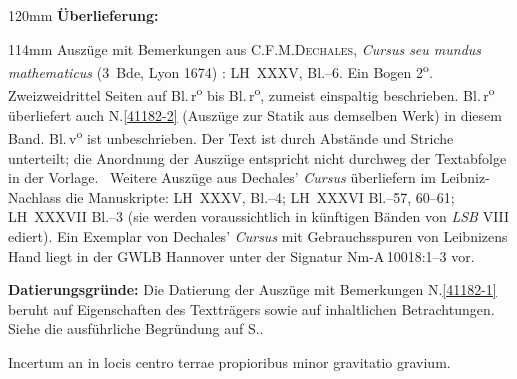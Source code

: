 %
\frenchspacing%
\begin{ledgroupsized}[r]{120mm}%
\footnotesize%
\pstart%
\noindent\textbf{Überlieferung:}%
\pend%
\end{ledgroupsized}%
\begin{ledgroupsized}[r]{114mm}%
\footnotesize%
\pstart%
\parindent -6mm%
%
Auszüge mit Bemerkungen aus
\textsc{C.\:F.\:M.\;Dechales},%
\textit{Cursus seu mundus mathematicus} (3~Bde, Lyon 1674)%
:\cite{00124}
LH~XXXV, Bl.--6.
Ein Bogen 2\textsuperscript{o}.
Zweizweidrittel Seiten auf Bl.\,r\textsuperscript{o} bis Bl.\,r\textsuperscript{o},
zumeist einspaltig beschrieben.
Bl.\,r\textsuperscript{o} überliefert auch N.\;\ref{41182-2} (Auszüge zur Statik aus demselben Werk) in diesem Band.
Bl.\,v\textsuperscript{o} ist unbeschrieben.
Der Text ist durch Abstände und Striche unterteilt;
die Anordnung der %
Auszüge entspricht nicht durchweg der Textabfolge in der %
Vorlage.
\textemdash\
Weitere Auszüge aus Dechales' \textit{Cursus} überliefern im Leibniz-Nachlass die Manuskripte:
LH~XXXV\;9,\;17 Bl.\;1--4; %
LH~XXXVI Bl.--57, 60--61; %
LH~XXXVII\;5 Bl.--3 %
(sie werden voraussichtlich in künftigen Bänden von \textit{LSB} VIII ediert).
Ein Exemplar von Dechales' \textit{Cursus} mit Gebrauchsspuren von Leibnizens Hand liegt in der GWLB Hannover unter der Signatur Nm-A\,10018:1--3 vor.
\pend%
\end{ledgroupsized}%
\vspace{5mm}%
\begin{ledgroup}%
\footnotesize%
\pstart%
\noindent%
\textbf{Datierungsgründe:}
Die Datierung der Auszüge mit Bemerkungen N.\;\ref{41182-1} beruht auf Eigenschaften des Textträgers sowie auf inhaltlichen Betrachtungen.
Siehe die ausführliche Begründung auf S.\;\pageref{41182_dat}.%
\pend%
\end{ledgroup}%
%
\frenchspacing%
\vspace{8mm}%
\normalsize%
\pstart%
\noindent%
\centering%
\hfill%
%
\hfill%
%
\pend%
\vspace{0.5em}%
\pstart%
\noindent%
Incertum an in locis centro terrae%
propioribus%
minor gravitatio gravium.%
%
